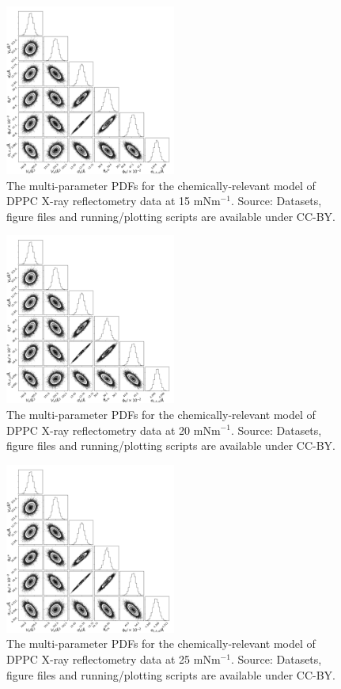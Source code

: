 \documentclass[11pt,a4paper]{paper}
\begin{document}
\begin{figure}[h]
	\centering
	\includegraphics[width=0.50\textwidth]{figures/dppc1_all_corner}
	\caption{The multi-parameter PDFs for the chemically-relevant model of DPPC X-ray reflectometry data at 15 mNm$^{-1}$. Source: Datasets, figure files and running/plotting scripts are available under CC-BY.\cite{mccluskey_2018}}
	\label{fig:dppc2}
\end{figure}
\begin{figure}[h]
	\centering
	\includegraphics[width=0.50\textwidth]{figures/dppc2_all_corner}
	\caption{The multi-parameter PDFs for the chemically-relevant model of DPPC X-ray reflectometry data at 20 mNm$^{-1}$. Source: Datasets, figure files and running/plotting scripts are available under CC-BY.\cite{mccluskey_2018}}
	\label{fig:dppc3}
\end{figure}
\begin{figure}[h]
	\centering
	\includegraphics[width=0.50\textwidth]{figures/dppc3_all_corner}
	\caption{The multi-parameter PDFs for the chemically-relevant model of DPPC X-ray reflectometry data at 25 mNm$^{-1}$. Source: Datasets, figure files and running/plotting scripts are available under CC-BY.\cite{mccluskey_2018}}
	\label{fig:dppc4}
\end{figure}
\end{document}
